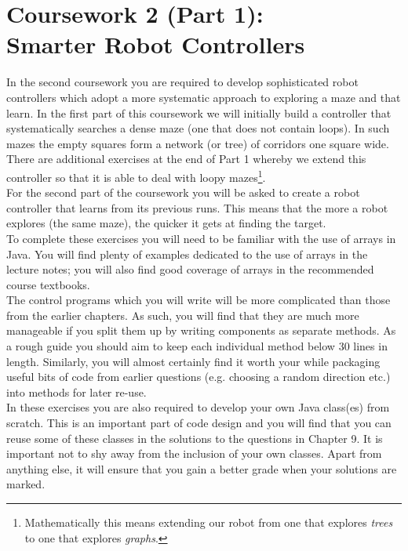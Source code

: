 \clearpage
\section{Coursework 2 (Part 1): \\ Smarter Robot Controllers}

In the second coursework you are required to develop
sophisticated robot controllers which adopt a more systematic approach to
exploring a maze and that learn. In the first part of this coursework we will
initially build a controller that systematically searches a dense maze (one
that does not contain loops). In such mazes the
empty squares form a network (or tree) of corridors one square wide. 
There are additional exercises at the end of Part 1 whereby we extend
this controller
so that it is able to deal with loopy mazes\footnote{Mathematically this
means extending our robot from one that explores {\em trees} to one that
explores {\em graphs}.}.\\

\noindent
For the second part of the coursework you will be asked to
create a robot controller that learns from its previous runs. This means that
the more a robot explores (the same maze), the quicker it gets at finding the
target.\\

\noindent
To complete these exercises you will need to be familiar with the use of arrays in
Java. You will find plenty of examples dedicated to the use of arrays in the lecture
notes; you will also find good coverage of arrays in the recommended
course textbooks.\\

\noindent
The control programs which you will write will be more complicated
than those from the earlier chapters. As such, you will find that they are much
more manageable if you split them up by writing components as separate
methods. As a rough guide you should aim to keep each individual method
below 30 lines in length. Similarly, you will almost certainly find it
worth your while packaging useful bits of code from earlier questions (e.g.
choosing a random direction etc.) into methods for later re-use.\\

\noindent
In these exercises you are also required to develop your own Java class(es)
from scratch. This is an important part of code design and you will find that
you can reuse some of these classes in the solutions to the questions in
Chapter 9. It is important not to shy away from the inclusion of your own
classes. Apart from anything else, it will ensure that you gain a better
grade when your solutions are marked. \\

